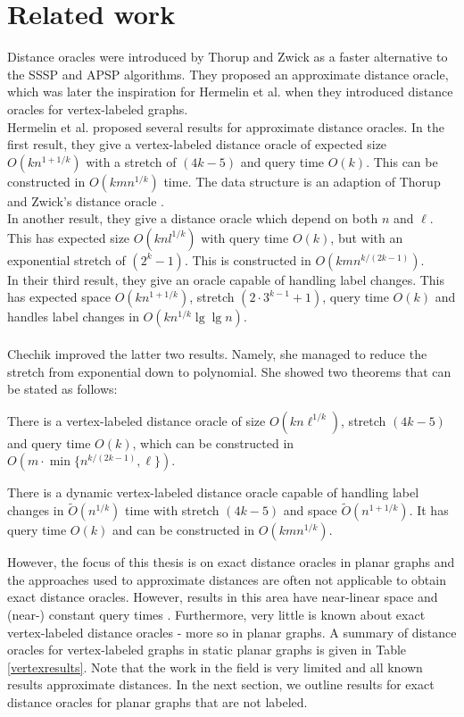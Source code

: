 \section{Related work}\label{survey}
Distance oracles were introduced by Thorup and Zwick \cite{thorup2005approximate} as a
faster alternative to the SSSP and APSP algorithms. They proposed an approximate distance
oracle, which was later the inspiration for Hermelin et al. when they introduced distance
oracles for vertex-labeled graphs. \\
Hermelin et al. \cite{hermelin2011distance} proposed several results for approximate
distance oracles. In the first result, they give a vertex-labeled distance oracle of
expected size $O(kn^{1+1/k})$ with a stretch of $(4k-5)$ and query time $O(k)$. This can
be constructed in $O(kmn^{1/k})$ time. The data structure is an adaption of Thorup and
Zwick's distance oracle \cite{thorup2005approximate}. \\
In another result, they give a distance oracle which depend on both $n$ and $\ell$. This has
expected size $O(knl^{1/k})$ with query time $O(k)$, but with an exponential stretch of
$(2^k-1)$. This is constructed in $O(kmn^{k/(2k-1)})$. \\
In their third result, they give an oracle capable of handling label changes. This has
expected space $O(kn^{1+1/k})$, stretch $(2\cdot3^{k-1}+1)$, query time $O(k)$ and
handles label changes in $O(kn^{1/k}\lg \lg n)$. \\
\\
Chechik \cite{chechik2012improved} improved the latter two results. Namely, she managed to
reduce the stretch from exponential down to polynomial. She showed two theorems that can
be stated as follows:
\begin{thm}\label{chech1}
  There is a vertex-labeled distance oracle
of size $O(kn\ell^{1/k})$, stretch $(4k-5)$  and query time $O(k)$, which can be
constructed in $O(m\cdot \min\{n^{k/(2k-1)}, \ell\})$.
\end{thm}
\begin{thm}\label{chech2}
  There is a dynamic vertex-labeled distance oracle capable of handling label changes in
$\tilde{O}(n^{1/k})$ time with stretch $(4k-5)$ and space $\tilde{O}(n^{1+1/k})$. It has
query time $O(k)$ and can be constructed in $O(kmn^{1/k})$.
\end{thm}
\noindent
However, the focus of this thesis is on exact distance oracles in planar graphs and the approaches used to
approximate distances are often not applicable to obtain exact distance oracles. However,
results in this area have near-linear space and (near-) constant query times
\cite{klein2002preprocessing} \cite{kawarabayashi2011linear} \cite{kawarabayashi2013more}
\cite{thorup2004compact} \cite{wulff2016approximate}.
Furthermore, very little is known about exact vertex-labeled distance oracles -
more so in planar graphs. A summary of distance oracles for vertex-labeled graphs in static planar graphs is given in Table
\ref{vertexresults}. Note that the work in the field is very limited and all known
results approximate distances. In the next section, we outline results for exact distance
oracles for planar graphs that are not labeled.

